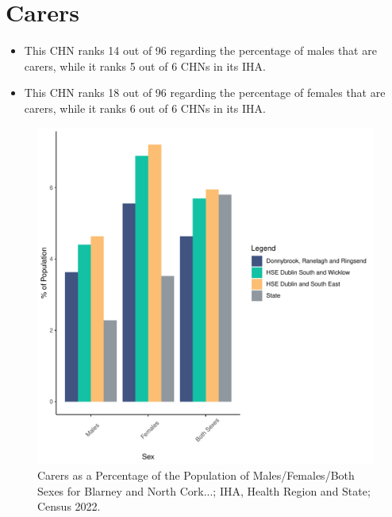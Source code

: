 \documentclass{article}
\begin{document}
\section{Carers}\label{sect:Carers}
\begin{itemize}
\item This CHN ranks  14 out of 96 regarding the percentage of males that are carers, while it ranks   5 out of 6 CHNs in its IHA.
\item This CHN ranks  18 out of 96 regarding the percentage of females that are carers, while it ranks   6 out of 6 CHNs in its IHA.
\end{itemize}
\begin{figure}[H]
	\centering
	\includegraphics[width = 150mm]{../figures/CareED.pdf}
	\caption{Carers as a Percentage of the Population of Males/Females/Both Sexes for Blarney and North Cork...; IHA, Health Region and State; Census 2022.}
	\label{fig:2ae19629-1a6a-13a3-e055-000000000001}
	\end{figure}
\end{document}
